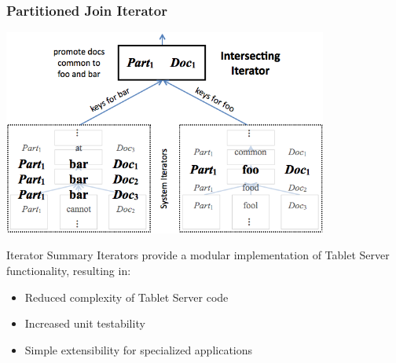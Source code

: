 \documentclass[t,landscape]{beamer}
\begin{document}

\begin{frame}
\frametitle{Partitioned Join Iterator}
\begin{center}
\includegraphics[width=0.8\textwidth]{images/intersecting_iterator_stack.png}
\end{center}
\end{frame}

\begin{frame}{Iterator Summary}
Iterators provide a modular implementation of Tablet Server functionality, resulting in:
\begin{itemize}
\item{Reduced complexity of Tablet Server code}
\item{Increased unit testability}
\item{Simple extensibility for specialized applications}
\end{itemize}
\end{frame}
\end{document}
